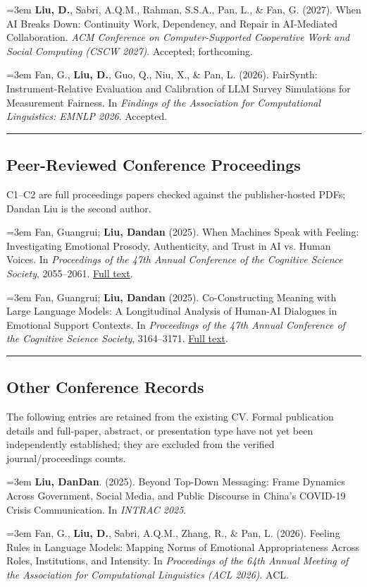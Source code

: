 \documentclass[a4paper,11pt]{article}
\newcommand{\hsep}{\noindent\textcolor{teal}{\rule{\textwidth}{0.5pt}}}
\newcommand{\block}[1]{\par\addvspace{7pt}\Needspace{5\baselineskip}\hsep\vspace{-8pt}\subsection*{#1}}
\newcommand{\publication}[2]{%
  \par\addvspace{8pt}\noindent
  \begin{minipage}{\linewidth}
    \fontsize{10.8}{13.4}\selectfont\raggedright
    \hangindent=3em\hangafter=1
    \makebox[3em][l]{\textcolor{teal}{[#1]}}#2
  \end{minipage}\par}
\begin{document}
\publication{A2}{\textbf{Liu, D.}, Sabri, A.Q.M., Rahman, S.S.A., Pan, L., \& Fan, G. (2027). When AI Breaks Down: Continuity Work, Dependency, and Repair in AI-Mediated Collaboration. \emph{ACM Conference on Computer-Supported Cooperative Work and Social Computing (CSCW 2027)}. Accepted; forthcoming.}

\publication{A3}{Fan, G., \textbf{Liu, D.}, Guo, Q., Niu, X., \& Pan, L. (2026). FairSynth: Instrument-Relative Evaluation and Calibration of LLM Survey Simulations for Measurement Fairness. In \emph{Findings of the Association for Computational Linguistics: EMNLP 2026}. Accepted.}


\block{Peer-Reviewed Conference Proceedings}
{\small C1--C2 are full proceedings papers checked against the publisher-hosted PDFs; Dandan Liu is the second author.}\par
\publication{C1}{Fan, Guangrui; \textbf{Liu, Dandan} (2025). When Machines Speak with Feeling: Investigating Emotional Prosody, Authenticity, and Trust in AI vs. Human Voices. In \emph{Proceedings of the 47th Annual Conference of the Cognitive Science Society}, 2055--2061. \href{https://escholarship.org/uc/item/8vr8s6h8}{Full text}.}

\publication{C2}{Fan, Guangrui; \textbf{Liu, Dandan} (2025). Co-Constructing Meaning with Large Language Models: A Longitudinal Analysis of Human-AI Dialogues in Emotional Support Contexts. In \emph{Proceedings of the 47th Annual Conference of the Cognitive Science Society}, 3164--3171. \href{https://escholarship.org/uc/item/4dn5q26f}{Full text}.}


\block{Other Conference Records}
{\small The following entries are retained from the existing CV. Formal publication details and full-paper, abstract, or presentation type have not yet been independently established; they are excluded from the verified journal/proceedings counts.}\par
\publication{R1}{\textbf{Liu, DanDan}. (2025). Beyond Top-Down Messaging: Frame Dynamics Across Government, Social Media, and Public Discourse in China's COVID-19 Crisis Communication. In \emph{INTRAC 2025}.}

\publication{R2}{Fan, G., \textbf{Liu, D.}, Sabri, A.Q.M., Zhang, R., \& Pan, L. (2026). Feeling Rules in Language Models: Mapping Norms of Emotional Appropriateness Across Roles, Institutions, and Intensity. In \emph{Proceedings of the 64th Annual Meeting of the Association for Computational Linguistics (ACL 2026)}. ACL.}
\end{document}
